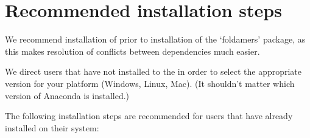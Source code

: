 \documentclass[letterpaper,12pt,english,openany,oneside]{sphinxmanual}
\begin{document}
\section{Recommended installation steps}
\label{\detokenize{install:recommended-installation-steps}}
We recommend installation of  prior to installation of the ‘foldamers’ package, as this makes resolution of conflicts between dependencies much easier.

We direct users that have not installed  to the  in order to select the appropriate version for your platform (Windows, Linux, Mac).  (It shouldn’t matter which version of Anaconda is installed.)

The following installation steps are recommended for users that have already installed  on their system:
\end{document}
